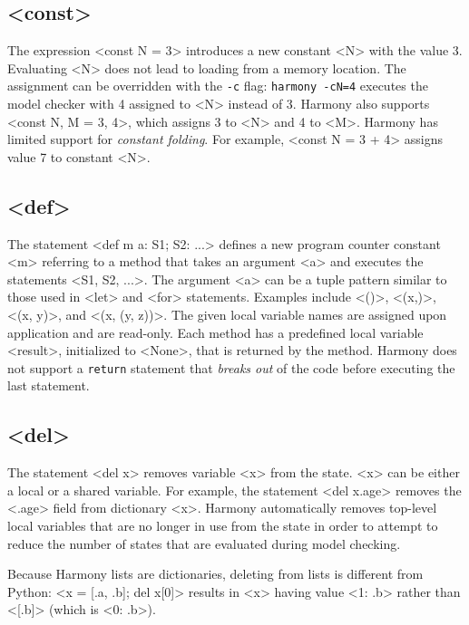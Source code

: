\documentclass{report}
\begin{document}
\subsection*{<{const}>}

The expression <{const N = 3}> introduces a new constant
<{N}> with the value 3.  Evaluating <{N}> does not lead to
loading from a memory location.  The assignment can be overridden with
the \texttt{-c} flag: \texttt{harmony -cN=4} executes the model checker
with 4 assigned to <{N}> instead of 3.
Harmony also supports <{const N, M = 3, 4}>, which
assigns 3 to <{N}> and 4 to <{M}>.
Harmony has limited support for \emph{constant folding}.  For example,
<{const N = 3 + 4}> assigns value 7 to constant <{N}>.

\subsection*{<{def}>}

The statement <{def m a: S1; S2: ...}>
defines a new program counter constant <{m}> referring to
a method that takes an argument <{a}> and executes the statements
<{S1, S2, ...}>.  The argument <{a}> can be a tuple pattern similar
to those used in <{let}> and <{for}> statements.
Examples include <{()}>, <{(x,)}>, <{(x, y)}>, and <{(x, (y, z))}>.
The given local variable names are assigned upon application and
are read-only.
Each method has a predefined local variable
<{result}>, initialized to <{None}>,
that is returned by the method.  Harmony does
not support a \texttt{return} statement that \emph{breaks out}
of the code before executing the last statement.

\subsection*{<{del}>}

The statement <{del x}> removes variable <{x}> from the
state.  <{x}> can be either a local or a shared variable.  For
example, the statement <{del x.age}> removes
the <{.age}> field from dictionary <{x}>.
Harmony automatically removes top-level local variables that
are no longer in use
from the state in order to attempt to reduce the number of states
that are evaluated during model checking.

Because Harmony lists are dictionaries, deleting from lists is different
from Python:
<{x = [.a, .b]; del x[0]}> results in <{x}> having value
<{{1: .b}}> rather than <{[.b]}> (which is <{{0: .b}}>).
\end{document}
